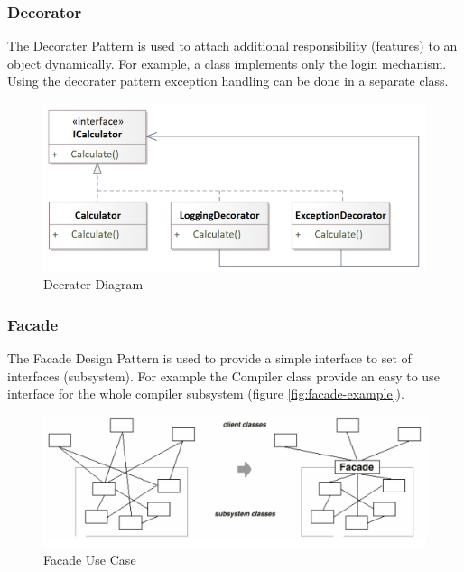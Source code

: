 \documentclass[11pt]{article}
\begin{document}
\subsubsection{Decorator}
\label{sec:org5fc6f7c}
The Decorater Pattern is used to attach additional responsibility (features) to an object dynamically.
For example, a class implements only the login mechanism.
Using the decorater pattern exception handling can be done in a separate class.


\begin{figure}[htbp]
\centering
\includegraphics[width=.9\linewidth]{img/decorater.png}
\caption{\label{fig:decrater-diagram}Decrater Diagram}
\end{figure}


\subsubsection{Facade}
\label{sec:org7bfea9a}
The Facade Design Pattern is used to provide a simple interface to set of interfaces (subsystem).
For example the Compiler class provide an easy to use interface for the whole compiler subsystem (figure \ref{fig:facade-example}).


\begin{figure}[htbp]
\centering
\includegraphics[width=.9\linewidth]{img/use_case_facade.png}
\caption{\label{fig:facade-use-case}Facade Use Case}
\end{figure}
\end{document}
